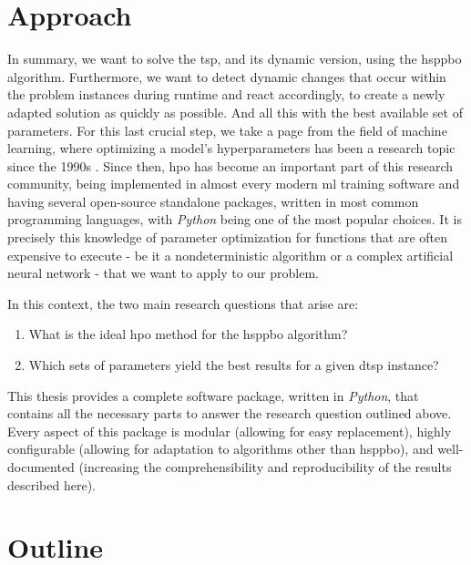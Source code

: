 \section{Approach}
\label{chap:approach}

In summary, we want to solve the \gls{tsp}, and its dynamic version, using the \gls{hsppbo} algorithm. Furthermore, we want to detect dynamic changes that occur within the problem instances during runtime and react accordingly, to create a newly adapted solution as quickly as possible. And all this with the best available set of parameters. For this last crucial step, we take a page from the field of machine learning, where optimizing a model's hyperparameters has been a research topic since the 1990s \cite{feurer2019hyperparameter}. Since then, \gls{hpo} has become an important part of this research community, being implemented in almost every modern \gls{ml} training software and having several open-source standalone packages, written in most common programming languages, with \textit{Python} being one of the most popular choices.
It is precisely this knowledge of parameter optimization for functions that are often expensive to execute - be it a nondeterministic algorithm or a complex artificial neural network - that we want to apply to our problem.

In this context, the two main research questions that arise are:
\begin{enumerate}
	\item What is the ideal \gls{hpo} method for the \gls{hsppbo} algorithm?
	\item Which sets of parameters yield the best results for a given \gls{dtsp} instance?
\end{enumerate}

This thesis provides a complete software package, written in \textit{Python}, that contains all the necessary parts to answer the research question outlined above. Every aspect of this package is modular (allowing for easy replacement), highly configurable (allowing for adaptation to algorithms other than \gls{hsppbo}), and well-documented (increasing the comprehensibility and reproducibility of the results described here).


\section{Outline}


